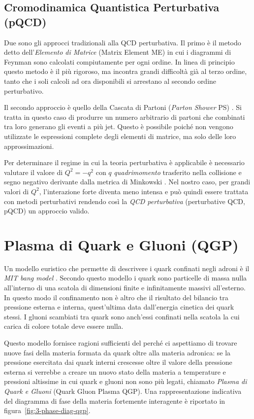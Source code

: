     \subsection{Cromodinamica Quantistica Perturbativa (pQCD)}
        Due sono gli approcci tradizionali alla QCD perturbativa. Il primo è il metodo detto dell'\textit{Elemento di Matrice} (Matrix Element ME) \cite{Vitale_1995} in cui i diagrammi di Feynman sono calcolati compiutamente per ogni ordine. In linea di principio questo metodo è il più rigoroso, ma incontra grandi difficoltà già al terzo ordine, tanto che i soli calcoli ad ora disponibili si arrestano al secondo ordine perturbativo.

        Il secondo approccio è quello della Cascata di Partoni (\textit{Parton Shower} PS) \cite{Bambah_199224}. Si tratta in questo caso di produrre un numero arbitrario di partoni che combinati tra loro generano gli eventi a più jet. Questo è possibile poiché non vengono utilizzate le espressioni complete degli elementi di matrice, ma solo delle loro approssimazioni.

        Per determinare il regime in cui la teoria perturbativa è applicabile è necessario valutare il valore di $Q^2 = - q^2$ con $q$ \textit{quadrimomento} trasferito nella collisione e segno negativo derivante dalla metrica di Minkowski \cite{Altarelli_2004}. Nel nostro caso, per grandi valori di $Q^2$, l'interazione forte diventa meno intensa e può quindi essere trattata con metodi perturbativi rendendo così la \textit{QCD perturbativa} (perturbative QCD, pQCD) un approccio valido.

\newpage

\section{Plasma di Quark e Gluoni (QGP)}
    Un modello euristico che permette di descrivere i quark confinati negli adroni è il \textit{MIT bang model} \cite{Wong_1994}. Secondo questo modello i quark sono particelle di massa nulla all'interno di una scatola di dimensioni finite e infinitamente massivi all'esterno. In questo modo il confinamento non è altro che il risultato del bilancio tra pressione esterna e interna, quest'ultima data dall'energia cinetica dei quark stessi. I gluoni scambiati tra quark sono anch'essi confinati nella scatola la cui carica di colore totale deve essere nulla.
    
    Questo modello fornisce ragioni sufficienti del perché ci aspettiamo di trovare nuove fasi della materia formata da quark oltre alla materia adronica: se la pressione esercitata dai quark interni crescesse oltre il valore della pressione esterna si verrebbe a creare un nuovo stato della materia a temperature e pressioni altissime in cui quark e gluoni non sono più legati, chiamato \textit{Plasma di Quark e Gluoni} (Quark Gluon Plasma QGP). Una rappresentazione indicativa del diagramma di fase della materia fortemente interagente è riportato in figura~\ref{fig:3-phase-diag-qgp}.
    
